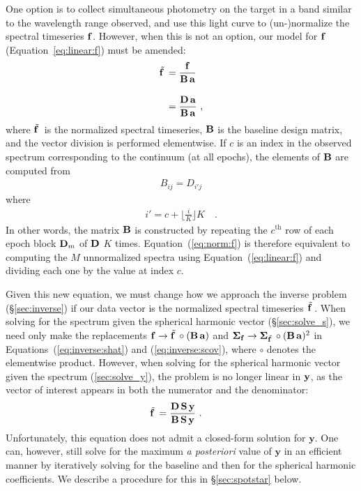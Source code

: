 \documentclass[modern]{aastex631}
\begin{document}
One option is to collect simultaneous photometry on the target in a band similar to the wavelength range observed, and use this light curve to (un-)normalize the spectral timeseries ${\mathbf{f}}$. 
However, when this is not an option, our model for ${\mathbf{f}}$ (Equation~\ref{eq:linear:f}) must be amended:
%
\begin{align}
    \label{eq:norm:f}
    \tilde{{\mathbf{f}}\hspace{0.2em}}
     & =
     \frac{
        \mathbf{f}
    } {
        {\mathbf{B}}
        \,
        {\mathbf{a}}
    }
    \nonumber 
    \\[1em]
    & =
    \frac{
        {\mathbf{D}}
        \,
        {\mathbf{a}}
    } {
        {\mathbf{B}}
        \,
        {\mathbf{a}}
    }
    \hskip 0.33em,
\end{align}
%
where $\tilde{{\mathbf{f}}\hspace{0.2em}}$ is the normalized spectral timeseries, ${\mathbf{B}}$ is the baseline design matrix, and the vector division is performed elementwise. 
If $c$ is an index in the observed spectrum corresponding to the continuum (at all epochs), the elements of ${\mathbf{B}}$ are computed from
%
\begin{align}
    B_{ij} = D_{i'j}
\end{align}
%
where
%
\begin{align}
    i' = c + \bigg\lfloor\frac{i}{K}\bigg\rfloor K
    \quad.
\end{align}
%
In other words, the matrix ${\mathbf{B}}$ is constructed by repeating the $c^\mathrm{th}$ row of each epoch block ${\mathbf{D}}_m$ of ${\mathbf{D}}$ $K$ times.
Equation~(\ref{eq:norm:f}) is therefore equivalent to computing the $M$ unnormalized spectra using Equation~(\ref{eq:linear:f}) and dividing each one by the value at index $c$.


Given this new equation, we must change how we approach the inverse problem (\S\ref{sec:inverse}) if our data vector is the normalized spectral timeseries $\tilde{{\mathbf{f}}\hspace{0.2em}}$. 
When solving for the spectrum given the spherical harmonic vector (\S\ref{sec:solve_s}), we need only make the replacements 
%
${\mathbf{f}} \rightarrow \tilde{{\mathbf{f}}\hspace{0.2em}} \circ ({\mathbf{B}}\, {\mathbf{a}})$ 
%
and 
%
$\boldsymbol{\Sigma}_\mathbf{f} \rightarrow \boldsymbol{\Sigma}_{\tilde{{\mathbf{f}}\hspace{0.2em}}} \circ ({\mathbf{B}}\, {\mathbf{a}})^2$ 
%
in Equations~(\ref{eq:inverse:shat}) and (\ref{eq:inverse:scov}), where $\circ$ denotes the elementwise product.
However, when solving for the spherical harmonic vector given the spectrum (\ref{sec:solve_y}), the problem is no longer linear in ${\mathbf{y}}$, as the vector of interest appears in both the numerator and the denominator:
%
\begin{align}
    \label{eq:norm:fy}
    \tilde{{\mathbf{f}}\hspace{0.2em}}
     & =
    \frac{
        {\mathbf{D}}
        \,
        {\mathbf{S}}
        \,
        {\mathbf{y}}
    }{
        {\mathbf{B}}
        \,
        {\mathbf{S}}
        \,
        {\mathbf{y}}
    }
    \hskip 0.33em.
\end{align}
%
Unfortunately, this equation does not admit a closed-form solution for $\mathbf{y}$. 
One can, however, still solve for the maximum \emph{a posteriori} value of $\mathbf{y}$ in an efficient manner by iteratively solving for the baseline and then for the spherical harmonic coefficients.
We describe a procedure for this in \S\ref{sec:spotstar} below.
\end{document}
